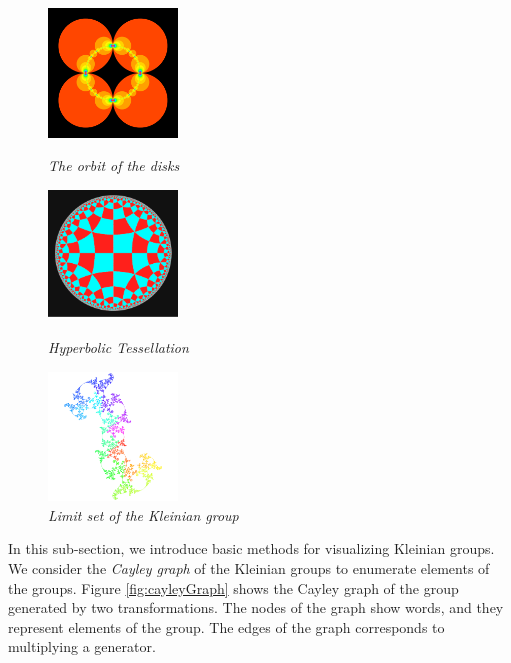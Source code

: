 \begin{figure}[htbp]
 \begin{minipage}[t]{0.3333\hsize}
  \center
  \includegraphics[height=1.35in, keepaspectratio]{img/preparation/basic/circleOrbit.png}
  \caption{\textit{The orbit of the disks}}
  \label{fig:circOrbit}
  \hspace*{\fill}
 \end{minipage}
 \begin{minipage}[t]{0.3333\hsize}
  \center
  \includegraphics[height=1.35in, keepaspectratio]{img/preparation/basic/hyperbolicTessellation.png}
  \caption{\textit{Hyperbolic Tessellation}}
  \label{fig:hypTiling}
  \hspace*{\fill}
 \end{minipage}
 \begin{minipage}[t]{0.3333\hsize}
  \center
  \includegraphics[height=1.35in, keepaspectratio]{img/preparation/limitSet/limit.png}
  \caption{\textit{Limit set of the Kleinian group}}
  \label{fig:limit}
  \hspace*{\fill}
 \end{minipage}
\end{figure}

\noindent In this sub-section, we introduce basic methods for visualizing Kleinian groups.
We consider the \textit{Cayley graph} of the Kleinian groups to enumerate elements
of the groups.
Figure \ref{fig:cayleyGraph} shows the Cayley graph of the group generated
by two transformations.
The nodes of the graph show words, and they represent elements of the
group.
The edges of the graph corresponds to multiplying a generator.

